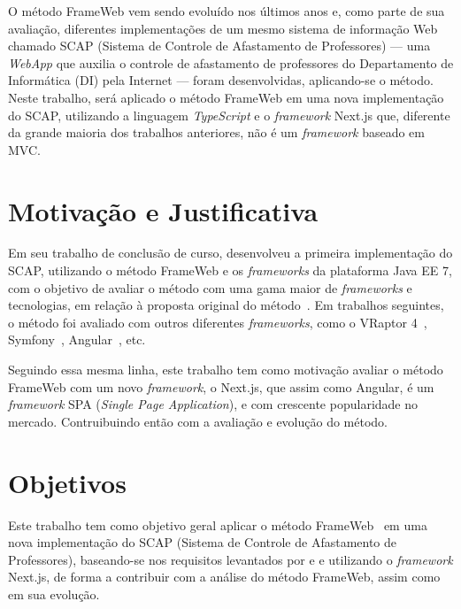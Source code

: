 O método FrameWeb vem sendo evoluído nos últimos anos e, como parte de sua avaliação, diferentes implementações de um mesmo 
sistema de informação Web chamado SCAP (Sistema de Controle de Afastamento de Professores) --- uma \textit{WebApp} que auxilia o 
controle de afastamento de professores do Departamento de Informática (DI) pela Internet --- foram desenvolvidas, aplicando-se o método. 
Neste trabalho, será aplicado o método FrameWeb em uma nova implementação do SCAP, utilizando
a linguagem \textit{TypeScript} e o \textit{framework} Next.js que, diferente da grande maioria dos trabalhos anteriores, 
não é um \textit{framework} baseado em MVC.



\section{Motivação e Justificativa}
\label{sec-intro-motjus}

Em seu trabalho de conclusão de curso,  desenvolveu a primeira implementação do SCAP, utilizando o método FrameWeb e os
\textit{frameworks} da plataforma Java EE 7, com o objetivo de avaliar o método com uma gama maior de \textit{frameworks} e tecnologias,
em relação à proposta original do método~\cite{souza:2007}. Em trabalhos seguintes, o método foi
avaliado com outros diferentes \textit{frameworks}, como o VRaptor 4~\cite{prado:2015}, 
Symfony~\cite{berger:2021}, Angular~\cite{gomes:2022}, etc.

Seguindo essa mesma linha, este trabalho tem como motivação avaliar o método FrameWeb com um novo \textit{framework},
o Next.js, que assim como Angular, é um \textit{framework} SPA (\textit{Single Page Application}), e com crescente popularidade 
no mercado. Contruibuindo então com a avaliação e evolução do método.



\section{Objetivos}
\label{sec-intro-obj}

Este trabalho tem como objetivo geral aplicar o método FrameWeb~\cite{souza:2007} em uma nova implementação do SCAP (Sistema de Controle de Afastamento de Professores),
baseando-se nos requisitos levantados por  e  e utilizando o \textit{framework} Next.js, de forma a contribuir com a análise do método FrameWeb, assim como em sua evolução.

